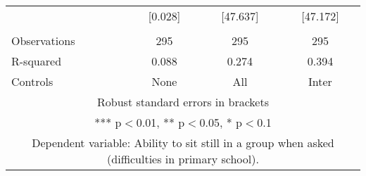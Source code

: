 \begin{tabular}{lccc}
 & [0.028] & [47.637] & [47.172] \\
 &  &  &  \\
Observations & 295 & 295 & 295 \\
R-squared & 0.088 & 0.274 & 0.394 \\
 Controls & None & All & Inter \\ \hline
\multicolumn{4}{c}{ Robust standard errors in brackets} \\
\multicolumn{4}{c}{ *** p$<$0.01, ** p$<$0.05, * p$<$0.1} \\
\multicolumn{4}{c}{ Dependent variable: Ability to sit still in a group when asked (difficulties in primary school).} \\
\end{tabular}
